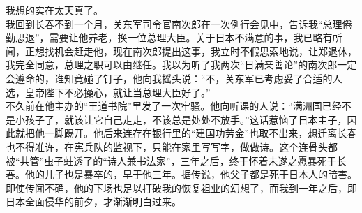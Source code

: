 我想的实在太天真了。\\

我回到长春不到一个月，关东军司令官南次郎在一次例行会见中，告诉我“总理倦勤思退”，需要让他养老，换一位总理大臣。关于日本不满意的事，我已略有所闻，正想找机会赶走他，现在南次郎提出这事，我立时不假思索地说，让郑退休，我完全同意，总理之职可以由继任。我以为听了我两次“日满亲善论”的南次郎一定会遵命的，谁知竟碰了钉子，他向我摇头说：“不，关东军已考虑妥了合适的人选，皇帝陛下不必操心，就让当总理大臣好了。”\\

不久前在他主办的“王道书院”里发了一次牢骚。他向听课的人说：“满洲国已经不是小孩子了，就该让它自己走走，不该总是处处不放手。”这话惹恼了日本主子，因此就把他一脚踢开。他后来连存在银行里的“建国功劳金”也取不出来，想迁离长春也不得准许，在宪兵队的监视下，只能在家里写写字，做做诗。这个连骨头都被“共管”虫子蛀透了的“诗人兼书法家”，三年之后，终于怀着未遂之愿暴死于长春。他的儿子也是暴卒的，早于他三年。据传说，他父子都是死于日本人的暗害。即使传闻不确，他的下场也足以打破我的恢复祖业的幻想了，而我到一年之后，即日本全面侵华的前夕，才渐渐明白过来。
